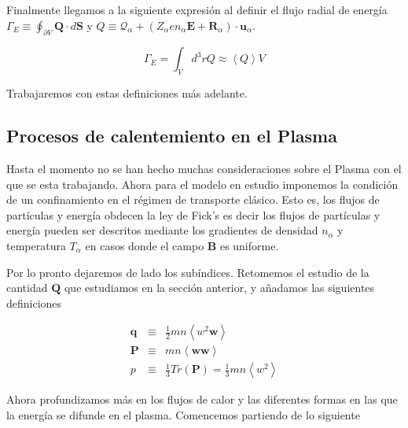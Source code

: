 \documentclass[11pt]{article}
\theoremstyle{definition}
\begin{document}
    Finalmente llegamos a la siguiente expresi\'on al definir el flujo radial de energ\'ia $\Gamma_E \equiv \oint_{\partial V} \textbf{Q}\cdot d\textbf{S}$ y $Q \equiv \mathcal{Q}_\alpha + (Z_\alpha e n_\alpha\textbf{E} + \textbf{R}_\alpha)\cdot\textbf{u}_\alpha$.

    \begin{equation}
      \Gamma_E = \int_Vd^3r Q \approx \left<Q\right>V
    \end{equation}

    Trabajaremos con estas definiciones m\'as adelante.

  \subsection{Procesos de calentemiento en el Plasma}

  Hasta el momento no se han hecho muchas consideraciones sobre el Plasma con el que se esta trabajando. Ahora para el modelo en estudio imponemos la condici\'on de un confinamiento en el r\'egimen de transporte cl\'asico. Esto es, los flujos de part\'iculas y energ\'ia obdecen la ley de Fick's es decir los flujos de part\'iculas y energ\'ia pueden ser descritos mediante los gradientes de densidad $n_\alpha$ y temperatura $T_\alpha$ en casos donde el campo $\textbf{B}$ es uniforme.

  Por lo pronto dejaremos de lado los sub\'indices. Retomemos el estudio de la cantidad $\textbf{Q}$ que estudiamos en la secci\'on anterior, y añadamos las siguientes definiciones

  \begin{eqnarray}
    \textbf{q} &\equiv& \frac{1}{2}mn\left<w^2\textbf{w}\right>\label{eq:q} \\
    \textbf{P} &\equiv&  mn\left<\textbf{ww}\right>\label{eq:tensorP} \\
    p &\equiv& \frac{1}{3}Tr(\textbf{P}) = \frac{1}{3}mn\left<w^2\right> \label{eq:pressureanisotropic}
  \end{eqnarray}

  Ahora profundizamos m\'as en los flujos de calor y las diferentes formas en las que la energ\'ia se difunde en el plasma. Comencemos partiendo de lo siguiente
\end{document}

